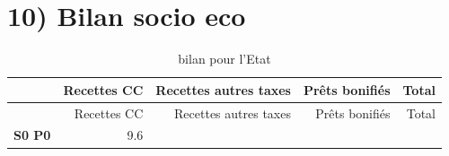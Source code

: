 \documentclass[]{article}
\begin{document}
\clearpage

\section{10) Bilan socio eco}\label{bilan-socio-eco}

\begin{longtable}[]{@{}crrrr@{}}
\caption{bilan pour l'Etat}\tabularnewline
\toprule
\begin{minipage}[b]{0.18\columnwidth}\centering\strut
~\strut
\end{minipage} & \begin{minipage}[b]{0.15\columnwidth}\raggedleft\strut
Recettes CC\strut
\end{minipage} & \begin{minipage}[b]{0.26\columnwidth}\raggedleft\strut
Recettes autres taxes\strut
\end{minipage} & \begin{minipage}[b]{0.18\columnwidth}\raggedleft\strut
Prêts bonifiés\strut
\end{minipage} & \begin{minipage}[b]{0.08\columnwidth}\raggedleft\strut
Total\strut
\end{minipage}\tabularnewline
\midrule
\endfirsthead
\toprule
\begin{minipage}[b]{0.18\columnwidth}\centering\strut
~\strut
\end{minipage} & \begin{minipage}[b]{0.15\columnwidth}\raggedleft\strut
Recettes CC\strut
\end{minipage} & \begin{minipage}[b]{0.26\columnwidth}\raggedleft\strut
Recettes autres taxes\strut
\end{minipage} & \begin{minipage}[b]{0.18\columnwidth}\raggedleft\strut
Prêts bonifiés\strut
\end{minipage} & \begin{minipage}[b]{0.08\columnwidth}\raggedleft\strut
Total\strut
\end{minipage}\tabularnewline
\midrule
\endhead
\begin{minipage}[t]{0.18\columnwidth}\centering\strut
\textbf{S0 P0}\strut
\end{minipage} & \begin{minipage}[t]{0.15\columnwidth}\raggedleft\strut
9.6\strut
\end{minipage} & \begin{minipage}[t]{0.26\columnwidth}\raggedleft\strut

\end{minipage}
\end{longtable}
\end{document}
